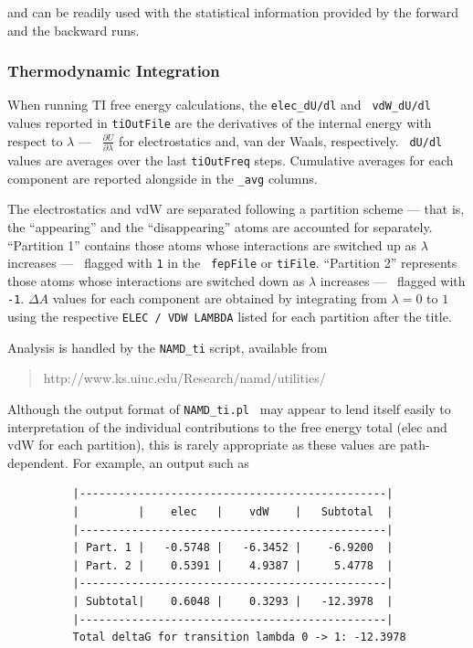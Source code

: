 \noindent and can be readily used with the statistical information provided by the forward and the backward runs.


\subsubsection{Thermodynamic Integration }


When running TI free energy calculations, the {\tt elec\_dU/dl} and {\tt
vdW\_dU/dl} values reported in {\tt tiOutFile} are the derivatives of the
internal energy with respect to $\lambda$ --- \ie~$\frac{\partial
U}{\partial\lambda}$ for electrostatics and, van der Waals, respectively. {\tt
dU/dl} values are averages over the last {\tt tiOutFreq} steps. Cumulative
averages for each component are reported alongside in the {\tt \_avg} columns.


The electrostatics and vdW are separated following a partition scheme --- that
is, the ``appearing'' and the ``disappearing'' atoms are accounted for
separately. ``Partition 1'' contains those atoms whose interactions are
switched up as $\lambda$ increases --- \ie~flagged with {\tt 1} in the {\tt
fepFile} or {\tt tiFile}. ``Partition 2'' represents those atoms whose interactions are
switched down as $\lambda$ increases --- \ie~flagged with {\tt -1}. $\Delta A$
values for each component are obtained by integrating from $\lambda=0$ to $1$
using the respective {\tt ELEC / VDW LAMBDA} listed for each partition after
the title.


Analysis is handled by the {\tt NAMD\_ti} script, available from
\begin{quote}
http://www.ks.uiuc.edu/Research/namd/utilities/
\end{quote}


Although the output format of {\tt NAMD\_ti.pl } may appear to lend itself easily to interpretation of the
individual contributions to the free energy total (elec and vdW for each partition), this is rarely
appropriate as these values are path-dependent. For example, an output such as


\begin{verbatim}
          |-----------------------------------------------|
          |         |    elec   |    vdW    |   Subtotal  |
          |-----------------------------------------------|
          | Part. 1 |   -0.5748 |   -6.3452 |    -6.9200  |
          | Part. 2 |    0.5391 |    4.9387 |     5.4778  |
          |-----------------------------------------------|
          | Subtotal|    0.6048 |    0.3293 |   -12.3978  |
          |-----------------------------------------------|
          Total deltaG for transition lambda 0 -> 1: -12.3978
\end{verbatim}


